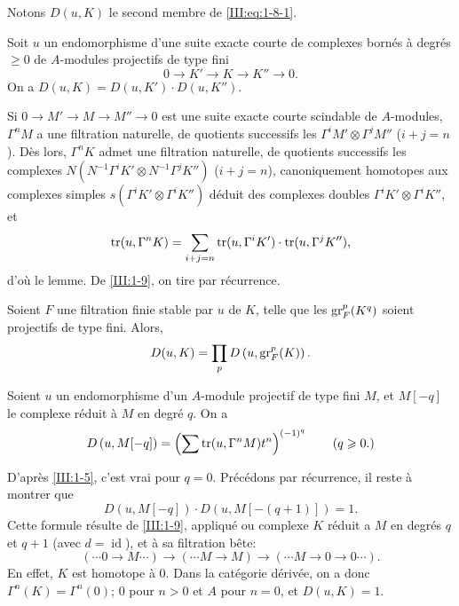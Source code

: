 Notons $D(u,K)$ le second membre de \eqref{III:eq:1-8-1}. 





\begin{lemma_}\label{III:1-9}
Soit $u$ un endomorphisme d'une suite exacte courte de complexes bornés à 
degrés $\geqslant 0$ de $A$-modules projectifs de type fini 
\[
  0 \to K' \to K \to K'' \to 0 \text{.}
\]
On a $D(u,K)=D(u,K')\cdot D(u,K'')$.
\end{lemma_}

Si $0\to M'\to M\to M''\to 0$ est une suite exacte courte scindable de 
$A$-modules, $\Gamma^n M$ a une filtration naturelle, de quotients successifs 
les $\Gamma^i M'\otimes \Gamma^j M''$ ($i+j=n$). Dès lors, $\Gamma^n K$ admet 
une filtration naturelle, de quotients successifs les complexes 
$N(N^{-1} \Gamma^i K'\otimes N^{-1}\Gamma^j K'')$ ($i+j=n$), canoniquement 
homotopes aux complexes simples $s(\Gamma^i K'\otimes \Gamma^i K'')$ déduit 
des complexes doubles $\Gamma^i K'\otimes \Gamma^i K''$, et 
\[
  \operatorname{tr}(u,\Gamma^n K) = \sum_{i+j=n} \operatorname{tr}(u,\Gamma^i K')\cdot \operatorname{tr}(u,\Gamma^j K'') \text{,}
\]
d'où le lemme. De \ref{III:1-9}, on tire par récurrence. 





\begin{lemma_}\label{III:1-10}
Soient $F$ une filtration finie stable par $u$ de $K$, telle que les 
$\operatorname{gr}_F^p(K^q)$ soient projectifs de type fini. Alors, 
\[
  D(u,K) = \prod_p D\left(u,\operatorname{gr}_F^p(K)\right) \text{.}
\]
\end{lemma_}





\begin{lemma_}\label{III:1-11}
Soient $u$ un endomorphisme d'un $A$-module projectif de type fini $M$, et 
$M[-q]$ le complexe réduit à $M$ en degré $q$. On a 
\[
  D\left(u,M[-q]\right) = \left(\sum \operatorname{tr}(u,\Gamma^n M) t^n\right)^{(-1)^q} \qquad \text{($q\geqslant 0$.)}
\]
\end{lemma_}





D'après \ref{III:1-5}, c'est vrai pour $q=0$. Précédons par récurrence, il 
reste à montrer que 
\[
  D\left(u,M[-q]\right) \cdot D\left(u,M[-(q+1)]\right) = 1 \text{.}
\]
Cette formule résulte de \ref{III:1-9}, appliqué ou complexe $K$ réduit a 
$M$ en degrés $q$ et $q+1$ (avec $d=\operatorname{id}$), et à sa 
filtration bête:
\[
  (\cdots 0 \to M \cdots) \to (\cdots M \to M) \to (\cdots M \to 0 \to 0 \cdots) \text{.}
\]
En effet, $K$ est homotope à $0$. Dans la catégorie dérivée, on a donc 
$\Gamma^n(K)=\Gamma^n(0)$; $0$ pour $n>0$ et $A$ pour $n=0$, et $D(u,K)=1$. 





